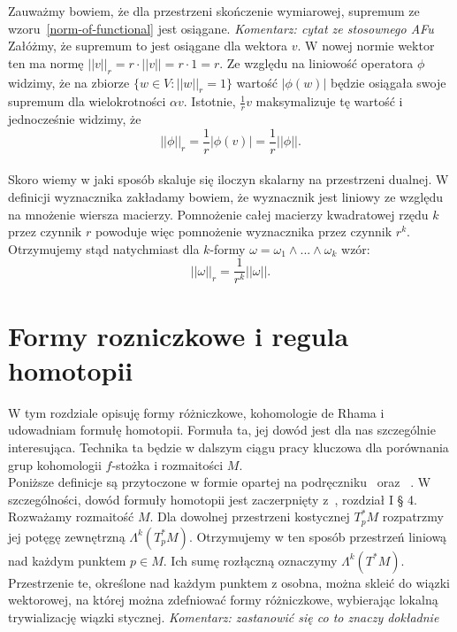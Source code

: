 \documentclass[licencjacka]{pracamgr}
\theoremstyle{definition}
\theoremstyle{definition}
\theoremstyle{plain}
\theoremstyle{plain}
\theoremstyle{plain}
\theoremstyle{plain}
\begin{document}
Zauważmy bowiem, że dla przestrzeni skończenie wymiarowej, supremum
ze wzoru~\ref{norm-of-functional} jest osiągane. 
\emph{Komentarz: cytat ze stosownego AFu}
Załóżmy, że supremum to jest osiągane dla wektora $v$. W nowej normie wektor
ten ma normę $|| v ||_r = r \cdot || v || = r \cdot 1 = r$. Ze względu
na liniowość operatora $\phi$ widzimy, że na zbiorze $\{w \in V: ||w||_r = 1\}$
wartość $| \phi (w) |$ będzie osiągała swoje supremum dla wielokrotności
$\alpha v$. Istotnie, $\frac{1}{r} v$ maksymalizuje tę wartość i 
jednocześnie widzimy, że 
\[
||\phi||_r = \frac{1}{r} |\phi(v)| = \frac{1}{r}|| \phi ||.
\]  \\

Skoro wiemy w jaki sposób skaluje się iloczyn skalarny na przestrzeni dualnej.
W definicji wyznacznika zakładamy bowiem, że wyznacznik jest liniowy ze względu
na mnożenie wiersza macierzy. Pomnożenie całej macierzy kwadratowej rzędu $k$
przez czynnik $r$ powoduje więc pomnożenie wyznacznika przez czynnik $r^k$.
Otrzymujemy stąd natychmiast dla $k$-formy $\omega = \omega_1 \wedge ... \wedge
\omega_k$  wzór:
\begin{equation}\label{scaling-of-norm}
|| \omega ||_r = \frac{1}{r^k} || \omega ||.
\end{equation}


\chapter{Formy rozniczkowe i regula homotopii}
W tym rozdziale opisuję formy różniczkowe, kohomologie de Rhama i
udowadniam formułę homotopii.  Formuła ta, jej dowód jest dla nas
szczególnie interesująca. Technika ta będzie w dalszym ciągu pracy
kluczowa dla porównania grup kohomologii $f$-stożka i rozmaitości
$M$. \\

Poniższe definicje są przytoczone w formie opartej na podręczniku~\cite{lee}
oraz ~\cite{bott}. W szczególności, dowód formuły homotopii jest zaczerpnięty
z~\cite{bott}, rozdział I § 4. \\

Rozważamy rozmaitość $M$. Dla dowolnej przestrzeni kostycznej 
$T_p^\ast M$ rozpatrzmy jej potęgę zewnętrzną $\Lambda^k(T_p^\ast M)$.
Otrzymujemy w ten sposób przestrzeń liniową nad każdym punktem $p \in M$.
Ich sumę rozłączną oznaczymy $\Lambda^k(T^\ast M)$. Przestrzenie te,
określone nad każdym punktem z osobna, można skleić do wiązki wektorowej, na
której można zdefniować formy różniczkowe, wybierając lokalną
trywializację wiązki stycznej. \emph{Komentarz: zastanowić się co to znaczy
dokładnie} \\
\end{document}
